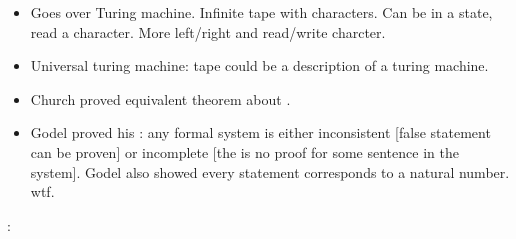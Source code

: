 \documentclass[12pt]{article}
\newcommand{\myspace}{\vspace{2\bigskipamount}}
\begin{document}
\begin{itemize}
	\item Goes over Turing machine. Infinite tape with characters. Can be in a state, read a character. More left/right and read/write charcter. 
	\item Universal turing machine: tape could be a description of a \textellipsis turing machine. 
	\item Church proved equivalent theorem about . 
	\item Godel proved his : any formal system is either inconsistent [false statement can be proven] or incomplete [the is no proof for some sentence in the system]. Godel also showed every statement corresponds to a natural number. wtf. 
\end{itemize}
\myspace
{}:
\end{document}
